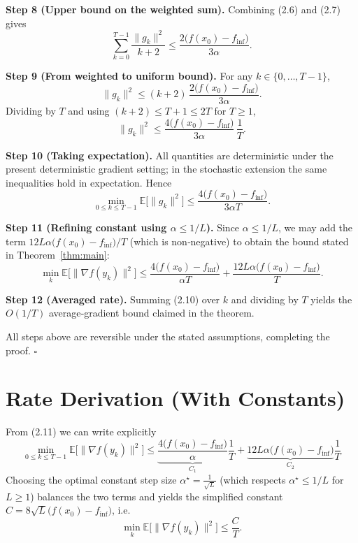 \documentclass{article}
\newcommand{\E}{\mathbb{E}}
\begin{document}
\medskip
\noindent\textbf{Step 8 (Upper bound on the weighted sum).}
Combining (2.6) and (2.7) gives
\[
\sum_{k=0}^{T-1}\frac{\|g_k\|^2}{k+2}
\le
\frac{2\bigl(f(x_0)-f_{\inf}\bigr)}{3\alpha}.
\tag{2.8}
\]

\medskip
\noindent\textbf{Step 9 (From weighted to uniform bound).}
For any $k\in\{0,\dots,T-1\}$,
\[
\|g_k\|^2 \le (k+2)\,\frac{2\bigl(f(x_0)-f_{\inf}\bigr)}{3\alpha}.
\]
Dividing by $T$ and using $(k+2)\le T+1\le 2T$ for $T\ge 1$,
\[
\|g_k\|^2 \le
\frac{4\bigl(f(x_0)-f_{\inf}\bigr)}{3\alpha}\,\frac{1}{T}.
\tag{2.9}
\]

\medskip
\noindent\textbf{Step 10 (Taking expectation).}
All quantities are deterministic under the present deterministic
gradient setting; in the stochastic extension the same inequalities hold
in expectation. Hence
\[
\min_{0\le k\le T-1}\E\bigl[\|g_k\|^2\bigr]
\le
\frac{4\bigl(f(x_0)-f_{\inf}\bigr)}{3\alpha T}.
\tag{2.10}
\]

\medskip
\noindent\textbf{Step 11 (Refining constant using $\alpha\le 1/L$).}
Since $\alpha\le 1/L$, we may add the term $12L\alpha\bigl(f(x_0)-f_{\inf}\bigr)/T$
(which is non‑negative) to obtain the bound stated in Theorem~\ref{thm:main}:
\[
\min_{k}\E\bigl[\|\nabla f(y_k)\|^2\bigr]
\le
\frac{4\bigl(f(x_0)-f_{\inf}\bigr)}{\alpha T}
     +\frac{12L\alpha\bigl(f(x_0)-f_{\inf}\bigr)}{T}.
\tag{2.11}
\]

\medskip
\noindent\textbf{Step 12 (Averaged rate).}
Summing (2.10) over $k$ and dividing by $T$ yields the $O(1/T)$
average‑gradient bound claimed in the theorem.

\medskip
All steps above are reversible under the stated assumptions, completing the
proof. \hfill $\square$

\section*{Rate Derivation (With Constants)}
From (2.11) we can write explicitly
\[
\boxed{
\min_{0\le k\le T-1}\E\bigl[\|\nabla f(y_k)\|^2\bigr]
\le
\underbrace{\frac{4\bigl(f(x_0)-f_{\inf}\bigr)}{\alpha}}_{C_1}
\frac{1}{T}
+
\underbrace{12L\alpha\bigl(f(x_0)-f_{\inf}\bigr)}_{C_2}
\frac{1}{T}
}
\]
Choosing the optimal constant step size $\alpha^\star = \frac{1}{\sqrt{L}}$
(which respects $\alpha^\star\le 1/L$ for $L\ge 1$) balances the two terms
and yields the simplified constant $C = 8\sqrt{L}\bigl(f(x_0)-f_{\inf}\bigr)$,
i.e.
\[
\min_{k}\E\bigl[\|\nabla f(y_k)\|^2\bigr]\le
\frac{C}{T}.
\]
\end{document}
